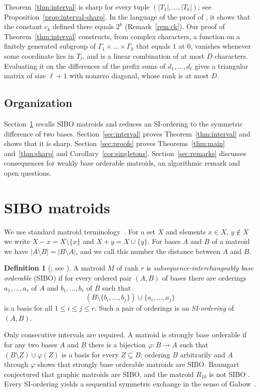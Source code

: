 \documentclass{amsart}
\theoremstyle{definition}
\newtheorem{definition}[theorem]{Definition}
\theoremstyle{remark}
\begin{document}
Theorem~\ref{thm:interval} is sharp for every tuple $(|T_1|,\dots,|T_k|)$; see Proposition~\ref{prop:interval-sharp}. In the language of the proof of \cite[Lemma~5.2]{GMOSY}, it shows that the constant $c_k$ defined there equals $2^k$ (Remark~\ref{rem:ck}). Our proof of Theorem~\ref{thm:interval} constructs, from complex characters, a function on a finitely generated subgroup of $\Gamma_1\times\dots\times\Gamma_k$ that equals $1$ at $0$, vanishes whenever some coordinate lies in $T_t$, and is a linear combination of at most $D$ characters. Evaluating it on the differences of the prefix sums of $d_1,\dots,d_\ell$ gives a triangular matrix of size $\ell+1$ with nonzero diagonal, whose rank is at most $D$.

\subsection*{Organization}
Section~\ref{sec:prelim} recalls SIBO matroids and reduces an SI-ordering to the symmetric difference of two bases. Section~\ref{sec:interval} proves Theorem~\ref{thm:interval} and shows that it is sharp. Section~\ref{sec:proofs} proves Theorems~\ref{thm:main} and~\ref{thm:sharp} and Corollary~\ref{cor:singletons}. Section~\ref{sec:remarks} discusses consequences for weakly base orderable matroids, an algorithmic remark and open questions.

\section{SIBO matroids}\label{sec:prelim}

We use standard matroid terminology~\cite{Oxley}. For a set $X$ and elements $x\in X$, $y\notin X$ we write $X-x=X\setminus\{x\}$ and $X+y=X\cup\{y\}$. For bases $A$ and $B$ of a matroid we have $|A\setminus B|=|B\setminus A|$, and we call this number the distance between $A$ and $B$.

\begin{definition}[\cite{Baumgart}; see {\cite[p.~85:3]{GMOSY}}]
A matroid $M$ of rank $r$ is \emph{subsequence-interchangeably base orderable} (SIBO) if for every ordered pair $(A,B)$ of bases there are orderings $a_1,\dots,a_r$ of $A$ and $b_1,\dots,b_r$ of $B$ such that
\[
(B\setminus\{b_i,\dots,b_j\})\cup\{a_i,\dots,a_j\}
\]
is a basis for all $1\le i\le j\le r$. Such a pair of orderings is an \emph{SI-ordering} of $(A,B)$.
\end{definition}

Only consecutive intervals are required. A matroid is strongly base orderable if for any two bases $A$ and $B$ there is a bijection $\varphi\colon B\to A$ such that $(B\setminus Z)\cup\varphi(Z)$ is a basis for every $Z\subseteq B$; ordering $B$ arbitrarily and $A$ through $\varphi$ shows that strongly base orderable matroids are SIBO. Baumgart~\cite{Baumgart} conjectured that graphic matroids are SIBO, and the matroid $R_{10}$ is not SIBO \cite[Theorem~4.2]{GMOSY}. Every SI-ordering yields a sequential symmetric exchange in the sense of Gabow~\cite{Gabow}.
\end{document}
